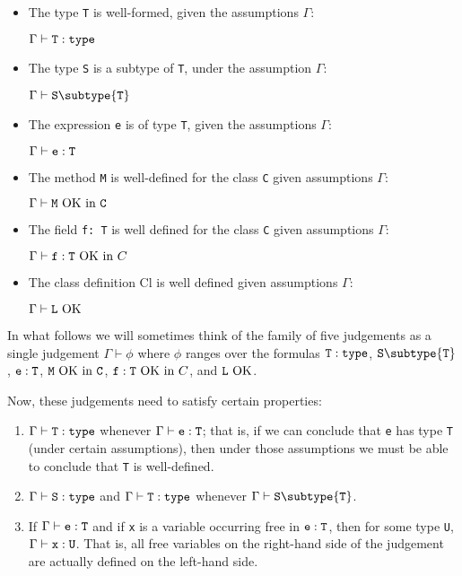 \begin{itemize}
\item
     The type {\tt T} is well-formed, given the assumptions $\Gamma$:

    $\Gamma \vdash {\tt T}: {\tt type}$

\item
     The type {\tt S} is a subtype of {\tt T}, under the assumption $\Gamma$:

      $\Gamma \vdash {\tt S} \subtype {\tt T}$

    \item The expression {\tt e} is of type {\tt T}, given the assumptions $\Gamma$:

      $\Gamma \vdash {\tt e}: {\tt T}$

    \item The method {\tt M} is well-defined for the class {\tt C}
given assumptions $\Gamma$:

      $\Gamma \vdash {\tt M}~\mbox{OK in}~{\tt C}$

    \item The field {\tt f: T} is well defined for the class {\tt C} given assumptions $\Gamma$:

      $\Gamma \vdash {\tt f: T}~\mbox{OK in}~C$

    \item The class definition Cl is well defined given assumptions $\Gamma$:

      $\Gamma \vdash {\tt L}~\mbox{OK}$

\end{itemize}


In what follows we will sometimes think of the family of five judgements
as a single judgement $\Gamma \vdash \phi$ where $\phi$ ranges over the
formulas 
    ${\tt T}: {\tt type}$,
      ${\tt S} \subtype {\tt T}$,
      ${\tt e}: {\tt T}$,
      ${\tt M}~\mbox{OK in}~{\tt C}$,
      ${\tt f: T}~\mbox{OK in}~C$, and
      ${\tt L}~\mbox{OK}$.


Now, these judgements need to satisfy certain properties:

\begin{enumerate}

\item
    $\Gamma \vdash {\tt T}: {\tt type}$
whenever 
      $\Gamma \vdash {\tt e}: {\tt T}$; that is,
if we can conclude that {\tt e}
      has type {\tt T} (under certain assumptions), then under those
      assumptions we must be able to conclude that {\tt T} is well-defined.

\item
    $\Gamma \vdash {\tt S}: {\tt type}$ and
    $\Gamma \vdash {\tt T}: {\tt type}$ whenever
      $\Gamma \vdash {\tt S} \subtype {\tt T}$.

\item
If 
      $\Gamma \vdash {\tt e}: {\tt T}$ and if {\tt x}
is a variable occurring free in ${\tt e}: {\tt T}$, then for some
      type {\tt U},
      $\Gamma \vdash {\tt x}: {\tt U}$.
That is, all free variables on the right-hand
      side of the judgement are actually defined on the left-hand side.
\end{enumerate}



